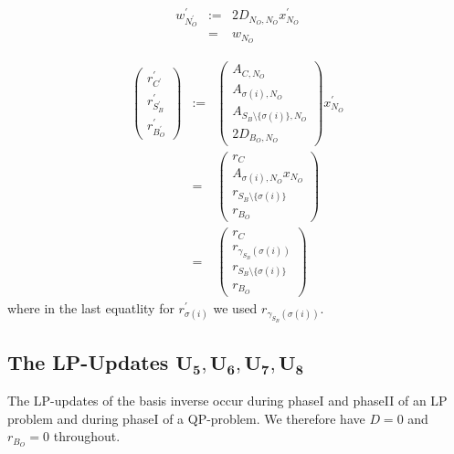 \documentclass[a4paper]{article}
\begin{document}
\begin{eqnarray}
w_{N_{O}^{\prime}}^{\prime}
&:=&
2D_{N_{O}, N_{O}}x_{N_{O}}^{\prime}
\nonumber \\
&=&
w_{N_{O}}
\end{eqnarray}

\begin{eqnarray}
\left(
\begin{array}{c}
r_{C^{\prime}}^{\prime} \\
\hline
r_{S_{B}^{\prime}}^{\prime} \\
\hline
r_{B_{O}^{\prime}}^{\prime}
\end{array}
\right)
&:=&
\left(
\begin{array}{c}
A_{C, N_{O}} \\
\hline
A_{\sigma(i), N_{O}} \\
\hline
A_{S_{B} \setminus \{\sigma(i)\}, N_{O}} \\
\hline
2D_{B_{O}, N_{O}} 
\end{array}
\right)
x_{N_{O}}^{\prime}
\nonumber \\
&=&
\left(
\begin{array}{c}
r_{C} \\
\hline
A_{\sigma(i), N_{O}}x_{N_{O}} \\
\hline
r_{S_{B} \setminus \{\sigma(i)\}} \\
\hline
r_{B_{O}}
\end{array}
\right)
\nonumber \\
&=&
\left(
\begin{array}{c}
r_{C} \\
\hline
r_{\gamma_{S_{B}}(\sigma(i))} \\
\hline
r_{S_{B} \setminus \{\sigma(i)\}} \\
\hline
r_{B_{O}}
\end{array}
\right)
\end{eqnarray}
where in the last equatlity for $r_{\sigma(i)}^{\prime}$ we used
$r_{\gamma_{S_{B}}(\sigma(i))}$.


\subsection{The LP-Updates $\mathbf{U_{5}}, \mathbf{U_{6}}, 
  \mathbf{U_{7}}, \mathbf{U_{8}}$}
The LP-updates of the basis inverse occur during phaseI and phaseII of an LP
problem and during phaseI of a QP-problem. We therefore have $D=0$ and 
$r_{B_{O}}=0$ throughout.  
\end{document}
